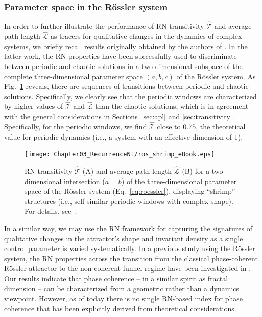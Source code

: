 		\subsubsection{Parameter space in the R\"ossler system}
		In order to further illustrate the performance of RN transitivity $\hat{\mathcal{T}}$ and average path length $\hat{\mathcal{L}}$ as tracers for qualitative changes in the dynamics of complex systems, we briefly recall results originally obtained by the authors of \cite{Zou2010}. In the latter work, the RN properties have been successfully used to discriminate between periodic and chaotic solutions in a two-dimensional subspace of the complete three-dimensional parameter space $(a,b,c)$ of the R\"ossler system. As Fig.~\ref{fig:roessler_shrimp} reveals, there are sequences of transitions between periodic and chaotic solutions. Specifically, we clearly see that the periodic windows are characterized by higher values of $\hat{\mathcal{T}}$ and $\hat{\mathcal{L}}$ than the chaotic solutions, which is in agreement with the general considerations in Sections~\ref{sec:apl} and \ref{sec:transitivity}. Specifically, for the periodic windows, we find $\hat{\mathcal{T}}$ close to $0.75$, the theoretical value for periodic dynamics (i.e., a system with an effective dimension of $1$).
		\begin{figure}
		\centering
			\texttt{[image: Chapter03\_RecurrenceNt/ros\_shrimp\_eBook.eps]}
		\caption{RN transitivity $\hat{\mathcal{T}}$ (A) and average path length $\hat{\mathcal{L}}$ (B) for a two-dimensional intersection ($a=b$) of the three-dimensional parameter space of the R\"ossler system (Eq.~\ref{eq:roessler}), displaying ``shrimp'' structures (i.e., self-similar periodic windows with complex shape). For details, see~\cite{Zou2010}.}
\label{fig:roessler_shrimp}
\end{figure}

		In a similar way, we may use the RN framework for capturing the signatures of qualitative changes in the attractor's shape and invariant density as a single control parameter is varied systematically. In a previous study using the R\"ossler system, the RN properties across the transition from the classical phase-coherent R\"ossler attractor to the non-coherent funnel regime have been investigated in \cite{Zou2012c}. Our results indicate that phase coherence -- in a similar spirit as fractal dimension -- can be characterized from a geometric rather than a dynamics viewpoint. However, as of today there is no single RN-based index for phase coherence that has been explicitly derived from theoretical considerations.



